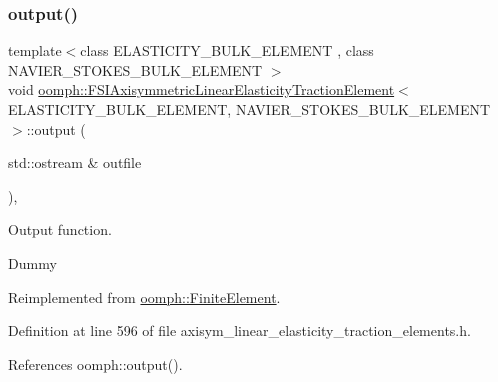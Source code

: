 \subsubsection{\texorpdfstring{output()}{output()}\hspace{0.1cm}{\footnotesize\ttfamily [1/4]}}
{\footnotesize\ttfamily template$<$class E\+L\+A\+S\+T\+I\+C\+I\+T\+Y\+\_\+\+B\+U\+L\+K\+\_\+\+E\+L\+E\+M\+E\+NT , class N\+A\+V\+I\+E\+R\+\_\+\+S\+T\+O\+K\+E\+S\+\_\+\+B\+U\+L\+K\+\_\+\+E\+L\+E\+M\+E\+NT $>$ \\
void \hyperlink{classoomph_1_1FSIAxisymmetricLinearElasticityTractionElement}{oomph\+::\+F\+S\+I\+Axisymmetric\+Linear\+Elasticity\+Traction\+Element}$<$ E\+L\+A\+S\+T\+I\+C\+I\+T\+Y\+\_\+\+B\+U\+L\+K\+\_\+\+E\+L\+E\+M\+E\+NT, N\+A\+V\+I\+E\+R\+\_\+\+S\+T\+O\+K\+E\+S\+\_\+\+B\+U\+L\+K\+\_\+\+E\+L\+E\+M\+E\+NT $>$\+::output (\begin{DoxyParamCaption}\item[{std\+::ostream \&}]{outfile }\end{DoxyParamCaption})\hspace{0.3cm}{\ttfamily [inline]}, {\ttfamily [virtual]}}



Output function. 

Dummy 

Reimplemented from \hyperlink{classoomph_1_1FiniteElement_a2ad98a3d2ef4999f1bef62c0ff13f2a7}{oomph\+::\+Finite\+Element}.



Definition at line 596 of file axisym\+\_\+linear\+\_\+elasticity\+\_\+traction\+\_\+elements.\+h.



References oomph\+::output().

\mbox{\label{classoomph_1_1FSIAxisymmetricLinearElasticityTractionElement_aa8de95635c065d9ba98a1faa67802d60}} 
